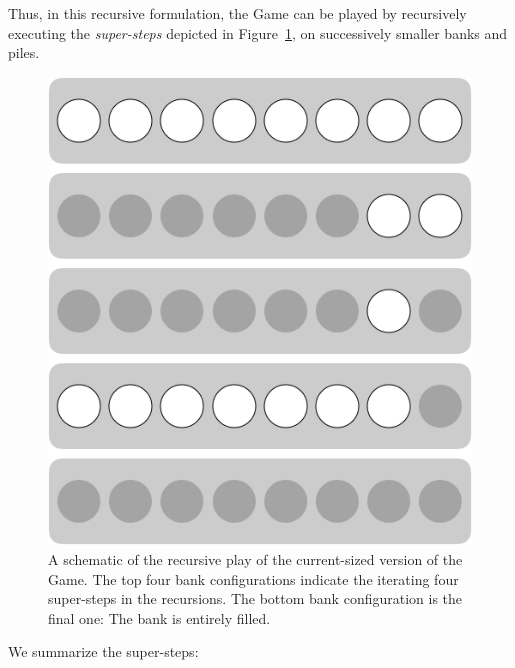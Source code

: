 Thus, in this recursive formulation, the Game can be played by recursively executing the {\em super-steps} depicted in Figure~\ref{fig:jeujetonsPrinciple}, on successively smaller banks and piles.
\begin{figure}[htb]
\begin{center}
        \includegraphics[scale=0.3]{FiguresMaths/GameTokenPrinciple.png}
\caption{A schematic of the recursive play of the current-sized version of the Game.  The top four bank configurations indicate the iterating four super-steps in the recursions.  The bottom bank configuration is the final one: The bank is entirely filled. }
        \label{fig:jeujetonsPrinciple}
\end{center}
\end{figure}
We summarize the super-steps:
